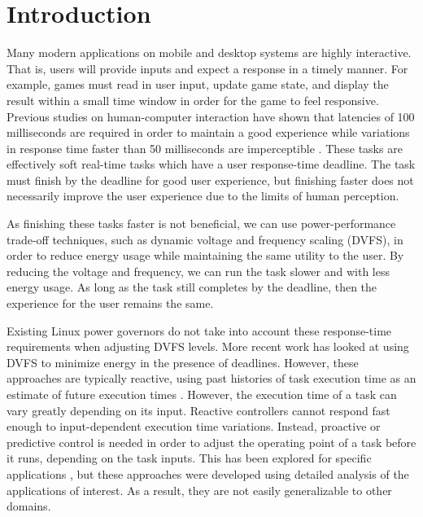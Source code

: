 \section{Introduction}
\label{sec:intro}

Many modern applications on mobile and desktop systems are highly interactive.
That is, users will provide inputs and expect a response in a timely manner.
For example, games must read in user input, update game state, and
display the result within a small time window in order for the game to feel
responsive. Previous studies on human-computer interaction have shown that
latencies of 100 milliseconds are required in order to maintain a good experience
\cite{endo-osdi96, card-chi91, miller-afips68} while 
variations in response time faster than 50 milliseconds are imperceptible
\cite{lindgaard-bit06, eqos-hpca15}. These tasks are effectively soft real-time tasks which have
a user
response-time deadline. The task must finish by the deadline for good user
experience, but finishing faster does not necessarily improve the user
experience due to the limits of human perception.

As finishing these tasks faster is not beneficial, we can use
power-performance trade-off techniques, such as dynamic voltage and frequency scaling
(DVFS), in order to reduce energy usage while maintaining the same utility to
the user. By reducing the voltage and frequency, we can run the task slower and
with less energy usage. As long as the task still completes by the deadline,
then the experience for the user remains the same. 

Existing Linux power governors \cite{linux_governors}
do not take into account these response-time requirements when adjusting DVFS
levels. More recent work has looked at using DVFS to minimize energy in the
presence of deadlines. 
However, these approaches are typically reactive, using past histories of task
execution time as an estimate of future execution times \cite{gu-dac08, choi-iccad02,
pegasus-isca14, nachiappan-hpca15}.
However, the execution time of a task can vary greatly depending on its input.
Reactive controllers cannot respond fast enough to
input-dependent execution time variations.
Instead, proactive or predictive control is needed in order to adjust the
operating point of a task before it runs, depending on the task inputs. This has been
explored 
for specific applications \cite{gu-rtas08, zhu-hpca13,
eqos-hpca15, adrenaline-hpca15}, but these approaches were developed using
detailed analysis of the applications of interest. As a result, they are not
easily generalizable to other domains.

